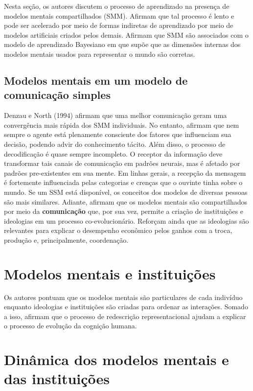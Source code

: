 \documentclass[11pt,lineno]{../style}
\newcommand{\autor}{Denzau e North (1994) }
\begin{document}
Nesta seção, os autores discutem o processo de aprendizado na presença de modelos mentais compartilhados (SMM). Afirmam que tal processo é lento e pode ser acelerado por meio de formas indiretas de aprendizado por meio de modelos artificiais criados pelos demais. Afirmam que SMM são associados com o modelo de aprendizado Bayesiano em que supõe que as dimensões internas dos modelos mentais usados para representar o mundo são corretas.

\subsection{Modelos mentais em um modelo de comunicação simples}

\autor afirmam que uma melhor comunicação geram uma convergência mais rápida dos SMM individuais. No entanto, afirmam que nem sempre o agente está plenamente consciente dos fatores que influenciam sua decisão, podendo advir do conhecimento tácito. Além disso, o processo de decodificação é quase sempre incompleto. O receptor da informação deve transformar tais canais de comunicação em padrões neurais, mas é afetado por padrões pre-existentes em sua mente. Em linhas gerais, a recepção da mensagem é fortemente influenciada pelas categorias e crenças que o ouvinte tinha sobre o mundo. Se um SSM está disponível, os conceitos dos modelos de diversas pessoas são mais similares.
Adiante, afirmam que os modelos mentais são compartilhados por meio da \textbf{comunicação} que, por sua vez, permite a criação de instituições e ideologias em um processo co-evolucionário. Reforçam ainda que as ideologias são relevantes para explicar o desempenho econômico pelos ganhos com a troca, produção e, principalmente, coordenação.


\section{Modelos mentais e instituições}

Os autores pontuam que os modelos mentais são particulares de cada indivíduo enquanto ideologias e instituições são criadas para ordenar as interações. Somado a isso, afirmam que o processo de redescrição representacional ajudam a explicar o processo de evolução da cognição humana.

\section{Dinâmica dos modelos mentais e das instituições}
\end{document}
